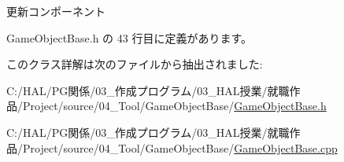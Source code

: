 更新コンポーネント 



 Game\+Object\+Base.\+h の 43 行目に定義があります。



このクラス詳解は次のファイルから抽出されました\+:\begin{DoxyCompactItemize}
\item 
C\+:/\+H\+A\+L/\+P\+G関係/03\+\_\+作成プログラム/03\+\_\+\+H\+A\+L授業/就職作品/\+Project/source/04\+\_\+\+Tool/\+Game\+Object\+Base/\mbox{\hyperlink{_game_object_base_8h}{Game\+Object\+Base.\+h}}\item 
C\+:/\+H\+A\+L/\+P\+G関係/03\+\_\+作成プログラム/03\+\_\+\+H\+A\+L授業/就職作品/\+Project/source/04\+\_\+\+Tool/\+Game\+Object\+Base/\mbox{\hyperlink{_game_object_base_8cpp}{Game\+Object\+Base.\+cpp}}\end{DoxyCompactItemize}
